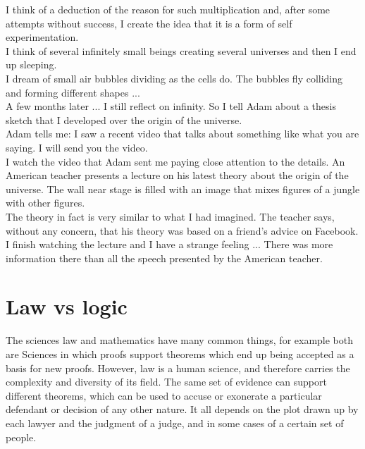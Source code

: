 \documentclass[11pt]{book}
\begin{document}
\noindent I think of a deduction of the reason for such multiplication and, after some attempts without success, I create the idea that it is a form of self experimentation. \\

\noindent I think of several infinitely small beings creating several universes and then I end up sleeping. \\

\noindent I dream of small air bubbles dividing as the cells do. The bubbles fly colliding and forming different shapes ...  \\

\noindent A few months later ... I still reflect on infinity. So I tell Adam about a thesis sketch that I developed over the origin of the universe. \\

\noindent Adam tells me: I saw a recent video that talks about something like what you are saying. I will send you the video. \\

\noindent I watch the video that Adam sent me paying close attention to the details. An American teacher presents a lecture on his latest theory about the origin of the universe. The wall near stage is filled with an image that mixes figures of a jungle with other figures. \\

\noindent The theory in fact is very similar to what I had imagined. The teacher says, without any concern, that his theory was based on a friend's advice on Facebook. \\

\noindent I finish watching the lecture and I have a strange feeling ... There was more information there than all the speech presented by the American teacher.

\chapter{Law vs logic}

The sciences law and mathematics have many common things, for example both are Sciences in which proofs support theorems which end up being accepted as a basis for new proofs. However, law is a human science, and therefore carries the complexity and diversity of its field. The same set of evidence can support different theorems, which can be used to accuse or exonerate a particular defendant or decision of any other nature. It all depends on the plot drawn up by each lawyer and the judgment of a judge, and in some cases of a certain set of people. \\
\end{document}
